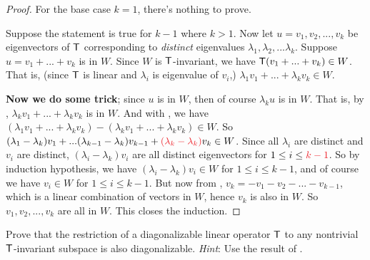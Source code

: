 \begin{proof}
For the base case \(k = 1\), there's nothing to prove.

Suppose the statement is true for \(k - 1\) where \(k > 1\).
Now let \(u = v_1, v_2, ..., v_k\) be eigenvectors of \(\textsf{T}\) corresponding to \emph{distinct} eigenvalues \(\lambda_1, \lambda_2, ... \lambda_k\).
Suppose \(u = v_1 + ... + v_k\) is in \(W\). 
Since \(W\) is \(\textsf{T}\)-invariant, we have \(\textsf{T}(v_1 + ... + v_k) \in W\).
That is, (since \(\textsf{T}\) is linear and \(\lambda_i\) is eigenvalue of \(v_i\),) \(\lambda_1 v_1 + ... + \lambda_k v_k \in W\). 

\textbf{Now we do some trick};
since \(u\) is in \(W\), then of course \(\lambda_k u\) is in \(W\).
That is, by , \(\lambda_k v_1 + ... + \lambda_k v_k\) is in \(W\).
And with , we have \((\lambda_1 v_1 + ... + \lambda_k v_k) - (\lambda_k v_1 + ... + \lambda_k v_k) \in W\).
So \((\lambda_1 - \lambda_k) v_1 + ... (\lambda_{k - 1} - \lambda_k) v_{k - 1} + \RED{(\lambda_k - \lambda_k)} v_k \in W\).
Since all \(\lambda_i\) are distinct and \(v_i\) are distinct, \((\lambda_i - \lambda_k) v_i\) are all distinct eigenvectors for \(1 \le i \le \RED{k - 1}\).
So by induction hypothesis, we have \((\lambda_i - \lambda_k) v_i \in W\) for \(1 \le i \le k - 1\), and of course we have \(v_i \in W\) for \(1 \le i \le k - 1\).
But now from , \(v_k = -v_1 - v_2 - ... - v_{k - 1}\), which is a linear combination of vectors in \(W\), hence \(v_k\) is also in \(W\).
So \(v_1, v_2, ..., v_k\) are all in \(W\).
This closes the induction.
\end{proof}

\begin{exercise} \label{exercise 5.4.24}
Prove that the restriction of a diagonalizable linear operator \(\textsf{T}\) to any nontrivial \(\textsf{T}\)-invariant subspace is also diagonalizable.
\emph{Hint}: Use the result of .
\end{exercise}

